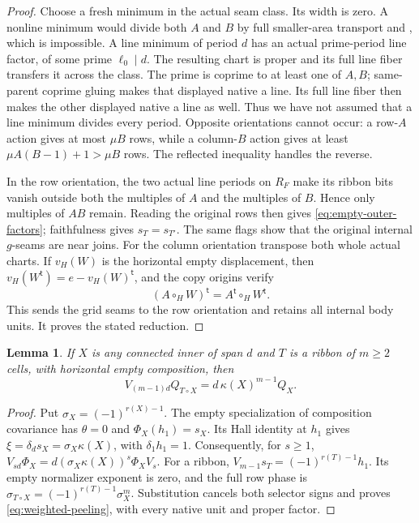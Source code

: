 \documentclass[11pt,a4paper]{amsart}
\numberwithin{equation}{section}
\theoremstyle{plain}
\newtheorem{lemma}[theorem]{Lemma}
\theoremstyle{definition}
\begin{document}
\begin{proof}
Choose a fresh minimum in the actual seam class.  Its width is zero.
A nonline minimum would divide both \(A\) and \(B\) by full smaller-area
transport and , which is impossible.  A line minimum of
period \(d\) has an actual prime-period line factor, of some prime
\(\ell_0\mid d\).  The resulting chart is proper and its full line fiber
transfers it across the class.  The prime is coprime to at least one of
\(A,B\); same-parent coprime gluing makes that displayed native a line.
Its full line fiber then makes the other displayed native a line as well.
Thus we have not assumed that a line minimum divides every period.
Opposite orientations cannot occur: a row-\(A\) action gives at most
\(\mu B\) rows, while a column-\(B\) action gives at least
\(\mu A(B-1)+1>\mu B\) rows.  The reflected inequality handles the reverse.

In the row orientation, the two actual line periods on \(R_F\) make its
ribbon bits vanish outside both the multiples of \(A\) and the multiples
of \(B\).  Hence only multiples of \(AB\) remain.  Reading the original rows
then gives \eqref{eq:empty-outer-factors}; faithfulness gives \(s_T=s_{T'}\).
The same flags show that the original internal \(g\)-seams are near joins.
For the column orientation transpose both whole actual charts.  If
\(v_H(W)\) is the horizontal empty displacement, then
\(v_H(W^{\mathsf t})=e-v_H(W)^{\mathsf t}\), and the copy origins verify
\[
 (A\circ_H W)^{\mathsf t}=A^{\mathsf t}\circ_H W^{\mathsf t}.
\]
This sends the grid seams to the row orientation and retains all internal
body units.  It proves the stated reduction.
\end{proof}

\begin{lemma}\label{lem:weighted-peeling}
If \(X\) is any connected inner of span \(d\) and \(T\) is a ribbon of \(m\ge2\)
cells, with horizontal empty composition, then
\begin{equation}\label{eq:weighted-peeling}
 V_{(m-1)d}Q_{T\circ X}=d\,\kappa(X)^{m-1}Q_X.
\end{equation}
\end{lemma}
\begin{proof}
Put \(\sigma_X=(-1)^{r(X)-1}\).  The empty specialization of composition
covariance \cite[Composition covariance]{Shields2026Readout} has \(\theta=0\) and \(\Phi_X(h_1)=s_X\).
Its Hall identity at \(h_1\) gives
\(\xi=\delta_ds_X=\sigma_X\kappa(X)\), with \(\delta_1h_1=1\).
Consequently, for \(s\ge1\),
\(V_{sd}\Phi_X=d(\sigma_X\kappa(X))^s\Phi_XV_s\).
For a ribbon, \(V_{m-1}s_T=(-1)^{r(T)-1}h_1\).
Its empty normalizer exponent is zero, and the full row phase is
\(\sigma_{T\circ X}=(-1)^{r(T)-1}\sigma_X^m\).
Substitution cancels both selector signs and proves
\eqref{eq:weighted-peeling}, with every native unit and proper factor.
\end{proof}
\end{document}
